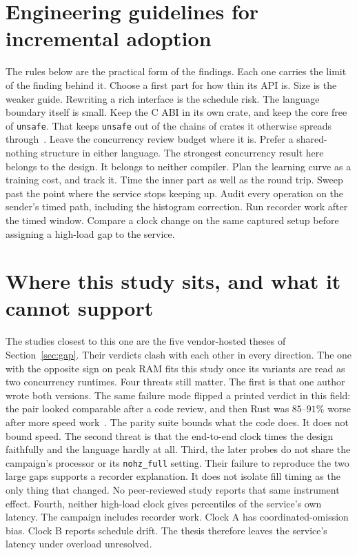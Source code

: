 \documentclass[english,oneside,a4paper,censored,csm,software-track-2020]{HYthesisML}
\begin{document}
\section{Engineering guidelines for incremental adoption}\label{sec:guidelines}
The rules below are the practical form of the findings. Each one carries the limit of the finding behind it.
Choose a first part for how thin its API is. Size is the weaker guide.
Rewriting a rich interface is the schedule risk. The language boundary itself is small.
Keep the C ABI in its own crate, and keep the core free of \texttt{unsafe}.
That keeps \texttt{unsafe} out of the chains of crates it otherwise spreads through~\cite{evans2020rust}.
Leave the concurrency review budget where it is.
Prefer a shared-nothing structure in either language.
The strongest concurrency result here belongs to the design. It belongs to neither compiler.
Plan the learning curve as a training cost, and track it.
Time the inner part as well as the round trip.
Sweep past the point where the service stops keeping up.
Audit every operation on the sender's timed path, including the histogram correction.
Run recorder work after the timed window.
Compare a clock change on the same captured setup before assigning a high-load gap to the service.

\section[Where this study sits]{Where this study sits, and what it cannot support}\label{sec:standing}
The studies closest to this one are the five vendor-hosted theses of Section~\ref{sec:gap}.
Their verdicts clash with each other in every direction.
The one with the opposite sign on peak RAM fits this study once its variants are read as two concurrency runtimes.
Four threats still matter.
The first is that one author wrote both versions.
The same failure mode flipped a printed verdict in this field: the pair looked comparable after a code review, and then Rust was $85$--$91\%$ worse after more speed work~\cite{emberg2023asn1}.
The parity suite bounds what the code does. It does not bound speed.
The second threat is that the end-to-end clock times the design faithfully and the language hardly at all.
Third, the later probes do not share the campaign's processor or its \texttt{nohz\_full} setting.
Their failure to reproduce the two large gaps supports a recorder explanation.
It does not isolate fill timing as the only thing that changed.
No peer-reviewed study reports that same instrument effect.
Fourth, neither high-load clock gives percentiles of the service's own latency.
The campaign includes recorder work. Clock A has coordinated-omission bias. Clock B reports schedule drift.
The thesis therefore leaves the service's latency under overload unresolved.
\end{document}
